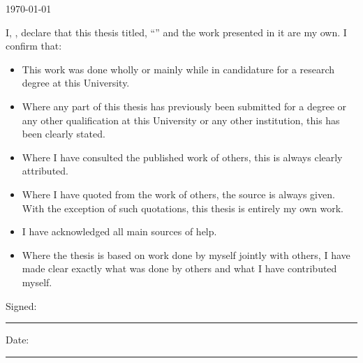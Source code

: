 \documentclass[
11pt, %
english, %
singlespacing, %
headsepline, %
]{MastersDoctoralThesis} %
\begin{document}
\begin{titlepage}
\begin{center}
\vfill

{\large \today}\\[4cm] %
 
\vfill
\end{center}
\end{titlepage}


\begin{declaration}
\addchaptertocentry{\authorshipname} %
\noindent I, \authorname, declare that this thesis titled, \enquote{\ttitle} and the work presented in it are my own. I confirm that:

\begin{itemize} 
\item This work was done wholly or mainly while in candidature for a research degree at this University.
\item Where any part of this thesis has previously been submitted for a degree or any other qualification at this University or any other institution, this has been clearly stated.
\item Where I have consulted the published work of others, this is always clearly attributed.
\item Where I have quoted from the work of others, the source is always given. With the exception of such quotations, this thesis is entirely my own work.
\item I have acknowledged all main sources of help.
\item Where the thesis is based on work done by myself jointly with others, I have made clear exactly what was done by others and what I have contributed myself.\\
\end{itemize}
 
\noindent Signed:\\
\rule[0.5em]{25em}{0.5pt} %
 
\noindent Date:\\
\rule[0.5em]{25em}{0.5pt} %
\end{declaration}

\cleardoublepage

\end{document}
